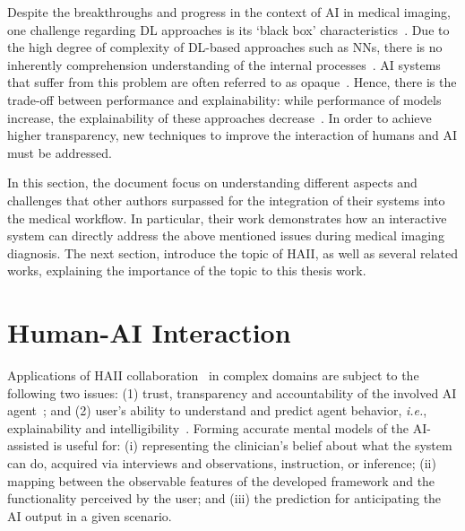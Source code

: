 Despite the breakthroughs and progress in the context of \ac{AI} in medical imaging, one challenge regarding \ac{DL} approaches is its `black box' characteristics~\cite{10.1007/978-3-030-50334-5_4, 10.1145/3306618.3314293}.
Due to the high degree of complexity of \ac{DL}-based approaches such as \acp{NN}, there is no inherently comprehension understanding of the internal processes~\cite{8851763}.
\ac{AI} systems that suffer from this problem are often referred to as opaque~\cite{zednik2019solving}.
Hence, there is the trade-off between performance and explainability: while performance of models increase, the explainability of these approaches decrease~\cite{gunning2017explainable}.
In order to achieve higher transparency, new techniques to improve the interaction of humans and \ac{AI} must be addressed.

In this section, the document focus on understanding different aspects and challenges that other authors surpassed for the integration of their systems into the medical workflow.
In particular, their work demonstrates how an interactive system can directly address the above mentioned issues during medical imaging diagnosis.
The next section, introduce the topic of \ac{HAII}, as well as several related works, explaining the importance of the topic to this thesis work.

\section{Human-AI Interaction}
\label{sec:chap003002}

Applications of \ac{HAII} collaboration~\cite{dellermann2019future} in complex domains are subject to the following two issues:
(1) trust, transparency and accountability of the involved \ac{AI} agent~\cite{10.1145/3290605.3300233}; and
(2) user's ability to understand and predict agent behavior, {\it i.e.}, explainability and intelligibility~\cite{Cai:2019:EEE:3301275.3302289, gunning2017explainable, miller2018explanation}.
Forming accurate mental models of the \ac{AI}-assisted is useful for:
(i) representing the clinician's belief about what the system can do, acquired via interviews and observations, instruction, or inference;
(ii) mapping between the observable features of the developed framework and the functionality perceived by the user; and
(iii) the prediction for anticipating the \ac{AI} output in a given scenario.

